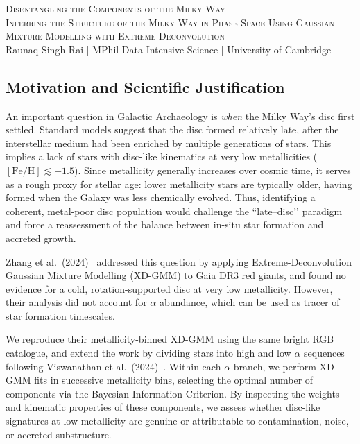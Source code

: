 \documentclass[a4paper,10pt]{article}
\begin{document}
\begin{center}
    {\Large \textsc{Disentangling the Components of the Milky Way}}\\[0.2cm]
    {\textsc{Inferring the Structure of the Milky Way in Phase-Space Using Gaussian Mixture Modelling with Extreme Deconvolution}}\\[0.2cm]
    Raunaq Singh Rai \quad | \quad MPhil Data Intensive Science \quad | \quad University of Cambridge
\end{center}

\begin{multicols}{2}

\section*{Motivation and Scientific Justification}

An important question in Galactic Archaeology is \emph{when} the Milky Way’s disc first settled.  
Standard models suggest that the disc formed relatively late, after the interstellar medium had been enriched by multiple generations of stars. 
This implies a lack of stars with disc-like kinematics at very low metallicities ($[\mathrm{Fe/H}] \lesssim -1.5$). 
Since metallicity generally increases over cosmic time, it serves as a rough proxy for stellar age: lower metallicity stars are typically older, having formed when the Galaxy was less chemically evolved. 
Thus, identifying a coherent, metal-poor disc population would challenge the “late–disc’’ paradigm and force a reassessment of the balance between in-situ star formation and accreted growth.

Zhang et al.\ (2024)~\cite{zhang2024existencemetalpoordiscmilky} addressed this question by applying Extreme-Deconvolution Gaussian Mixture Modelling (XD-GMM) to Gaia DR3 red giants, and found no evidence for a cold, rotation-supported disc at very low metallicity.  
However, their analysis did not account for $\alpha$ abundance, which can be used as tracer of star formation timescales.

We reproduce their metallicity-binned XD-GMM using the same bright RGB catalogue, and extend the work by dividing stars into high and low $\alpha$ sequences following Viswanathan et al.\ (2024)~\cite{Vis2024}.  
Within each $\alpha$ branch, we perform XD-GMM fits in successive metallicity bins, selecting the optimal number of components via the Bayesian Information Criterion.  
By inspecting the weights and kinematic properties of these components, we assess whether disc-like signatures at low metallicity are genuine or attributable to contamination, noise, or accreted substructure.


\end{multicols}
\end{document}
